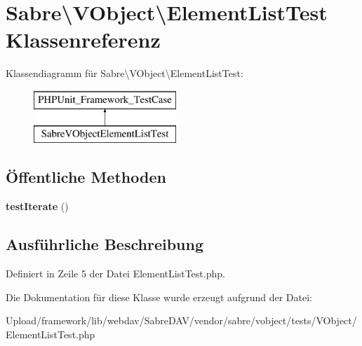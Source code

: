 \hypertarget{class_sabre_1_1_v_object_1_1_element_list_test}{}\section{Sabre\textbackslash{}V\+Object\textbackslash{}Element\+List\+Test Klassenreferenz}
\label{class_sabre_1_1_v_object_1_1_element_list_test}
Klassendiagramm für Sabre\textbackslash{}V\+Object\textbackslash{}Element\+List\+Test\+:\begin{figure}[H]
\begin{center}
\leavevmode
\includegraphics[height=2.000000cm]{class_sabre_1_1_v_object_1_1_element_list_test}
\end{center}
\end{figure}
\subsection*{Öffentliche Methoden}
\begin{DoxyCompactItemize}
\item 
\mbox{\label{class_sabre_1_1_v_object_1_1_element_list_test_aeabd3deb77ffdbb61daafa5dfd053b90}} 
{\bfseries test\+Iterate} ()
\end{DoxyCompactItemize}


\subsection{Ausführliche Beschreibung}


Definiert in Zeile 5 der Datei Element\+List\+Test.\+php.



Die Dokumentation für diese Klasse wurde erzeugt aufgrund der Datei\+:\begin{DoxyCompactItemize}
\item 
Upload/framework/lib/webdav/\+Sabre\+D\+A\+V/vendor/sabre/vobject/tests/\+V\+Object/Element\+List\+Test.\+php\end{DoxyCompactItemize}
